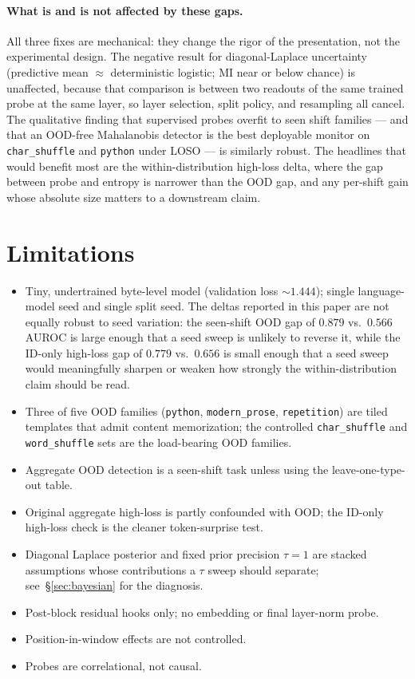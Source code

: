 \documentclass[11pt]{article}
\begin{document}
\paragraph{What is and is not affected by these gaps.} All three fixes are mechanical: they change the rigor of the presentation, not the experimental design. The negative result for diagonal-Laplace uncertainty (predictive mean $\approx$ deterministic logistic; MI near or below chance) is unaffected, because that comparison is between two readouts of the same trained probe at the same layer, so layer selection, split policy, and resampling all cancel. The qualitative finding that supervised probes overfit to seen shift families --- and that an OOD-free Mahalanobis detector is the best deployable monitor on \texttt{char\_shuffle} and \texttt{python} under LOSO --- is similarly robust. The headlines that would benefit most are the within-distribution high-loss delta, where the gap between probe and entropy is narrower than the OOD gap, and any per-shift gain whose absolute size matters to a downstream claim.

\section{Limitations}

\begin{itemize}[topsep=2pt,itemsep=0pt]
  \item Tiny, undertrained byte-level model (validation loss $\sim 1.444$); single language-model seed and single split seed. The deltas reported in this paper are not equally robust to seed variation: the seen-shift OOD gap of $0.879$ vs.\ $0.566$ AUROC is large enough that a seed sweep is unlikely to reverse it, while the ID-only high-loss gap of $0.779$ vs.\ $0.656$ is small enough that a seed sweep would meaningfully sharpen or weaken how strongly the within-distribution claim should be read.
  \item Three of five OOD families (\texttt{python}, \texttt{modern\_prose}, \texttt{repetition}) are tiled templates that admit content memorization; the controlled \texttt{char\_shuffle} and \texttt{word\_shuffle} sets are the load-bearing OOD families.
  \item Aggregate OOD detection is a seen-shift task unless using the leave-one-type-out table.
  \item Original aggregate high-loss is partly confounded with OOD; the ID-only high-loss check is the cleaner token-surprise test.
  \item Diagonal Laplace posterior and fixed prior precision $\tau=1$ are stacked assumptions whose contributions a $\tau$ sweep should separate; see~\S\ref{sec:bayesian} for the diagnosis.
  \item Post-block residual hooks only; no embedding or final layer-norm probe.
  \item Position-in-window effects are not controlled.
  \item Probes are correlational, not causal.
\end{itemize}
\end{document}
